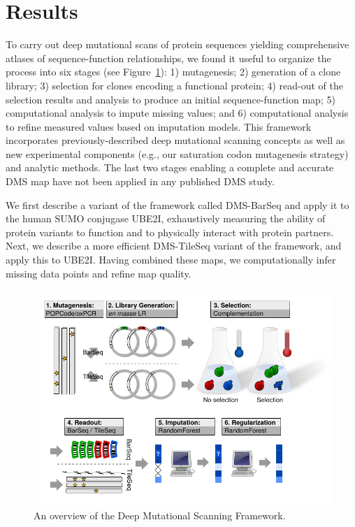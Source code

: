 \section{Results}

To carry out deep mutational scans of protein sequences yielding comprehensive atlases of sequence-function relationships, we found it useful to organize the process into six stages (see Figure~\ref{fig:framework}): 1) mutagenesis; 2) generation of a clone library; 3) selection for clones encoding a functional protein; 4) read-out of the selection results and analysis to produce an initial sequence-function map; 5) computational analysis to impute missing values; and 6) computational analysis to refine measured values based on imputation models. This framework incorporates previously-described deep mutational scanning concepts as well as new experimental components (e.g., our saturation codon mutagenesis strategy) and analytic methods.  The last two stages enabling a complete and accurate DMS map have not been applied in any published DMS study.

We first describe a variant of the framework called DMS-BarSeq and apply it to the human SUMO conjugase UBE2I, exhaustively measuring the ability of protein variants to function and to physically interact with protein partners.  Next, we describe a more efficient DMS-TileSeq variant of the framework, and apply this to UBE2I.  Having combined these maps, we computationally infer missing data points and refine map quality.


\begin{figure}[h!]
	\centering
	\includegraphics[width=\textwidth]{img/framework_flowchart.pdf}
	\caption{An overview of the Deep Mutational Scanning Framework.}
	\label{fig:framework}
\end{figure}


